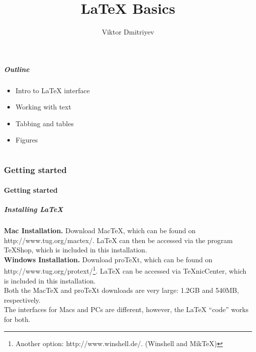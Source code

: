 \documentclass[slidestop,compress,mathserif]{beamer}
\title{LaTeX Basics}
\subtitle{}
\author{Viktor Dmitriyev}
\institute{Adapter from Mini Course on LaTeX by \href{https://github.com/OpenIntroOrg/mini-course-materials}{David Diez}}
\date{}
\begin{document}
\newenvironment{act}[1]{{\color{command}#1}}{}


\frame{ \titlepage }

\begin{frame}
  \frametitle{Outline}
  \begin{itemize}
  \item Intro to LaTeX interface
  \item Working with text
  \item Tabbing and tables
  \item Figures
  \end{itemize}
\end{frame}

\part{}

\section[Getting started]{Getting started}
\subsection[Getting started]{Getting started}

\begin{frame} \frametitle{Installing LaTeX}
{\bf Mac Installation. } Download MacTeX, which can be found on {\color{highlight}http://www.tug.org/mactex/}. LaTeX can then be accessed via the program TeXShop, which is included in this installation. \\
\vspace{0.5cm}
{\bf Windows Installation. } Download proTeXt, which can be found on {\color{highlight}http://www.tug.org/protext/}\footnote{Another option: {\color{highlight}http://www.winshell.de/}. (Winshell and MikTeX)}. LaTeX can be accessed via TeXnicCenter, which is included in this installation. \\
\vspace{0.5cm}
Both the MacTeX and proTeXt downloads are very large: 1.2GB and 540MB, respectively. \\
\vspace{0.5cm}
The interfaces for Macs and PCs are different, however, the LaTeX ``code'' works for both.
\end{frame}
\end{document}
